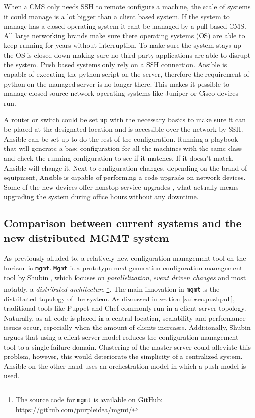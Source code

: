 When a CMS only needs SSH to remote configure a machine, the scale of systems it could manage is a lot bigger than a client based system. If the system to manage has a closed operating system it cant be managed by a pull based CMS. All large networking brands make sure there operating systems (OS) are able to keep running for years without interruption. To make sure the system stays up the OS is closed down making sure no third party applications are able to disrupt the system. Push based systems only rely on a SSH connection. Ansible is capable of executing the python script on the server, therefore the requirement of python on the managed server is no longer there. This makes it possible to manage closed source network operating systems like Juniper or Cisco devices run. 

A router or switch could be set up with the necessary basics to make sure it can be placed at the designated location and is accessible over the network by SSH. Ansible can be set up to do the rest of the configuration. Running a playbook that will generate a base configuration for all the machines with the same class and check the running configuration to see if it matches. If it doesn't match. Ansible will change it. Next to configuration changes, depending on the brand of equipment, Ansible is capable of performing a code upgrade on network devices. Some of the new devices offer nonstop service upgrades \cite{NSSU}\cite{ISSU}, what actually means upgrading the system during office hours without any downtime.  

\subsection{Comparison between current systems and the new distributed MGMT system}\label{subsec:distributedmgmt}
As previously alluded to, a relatively new configuration management tool on the horizon is \texttt{mgmt}. \texttt{Mgmt} is a prototype next generation configuration management tool by Shubin \cite{shubin2016}, which focuses on \textit{parallelization}, \textit{event driven changes} and most notably, a \textit{distributed architecture} \footnote{The source code for \texttt{mgmt} is available on GitHub: \url{https://github.com/purpleidea/mgmt/}}. The main innovation in \texttt{mgmt} is the distributed topology of the system. As discussed in section \ref{subsec:pushpull}, traditional tools like Puppet and Chef commonly run in a client-server topology. Naturally, as all code is placed in a central location, scalability and performance issues occur, especially when the amount of clients increases. Additionally, Shubin argues that using a client-server model reduces the configuration management tool to a single failure domain. Clustering of the master server could alleviate this problem, however, this would deteriorate the simplicity of a centralized system. Ansible on the other hand uses an orchestration model in which a push model is used.
 
